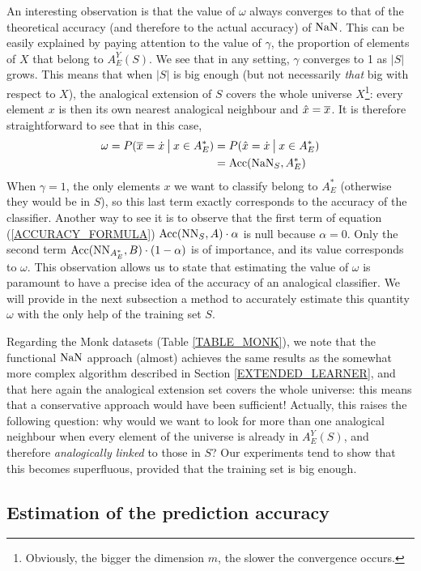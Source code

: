 {An interesting observation is that the value of $\omega$ always converges to
that of the theoretical accuracy (and therefore to the actual accuracy) of
$\NaN$. This can be easily explained by paying attention to the value of
$\gamma$, the proportion of elements of $X$ that belong to $A_E^Y(S)$. We see
that in any setting, $\gamma$ converges to 1 as $|S|$ grows. This means that
when $|S|$ is big enough (but not necessarily \textit{that} big with respect to $X$), the
analogical extension of $S$ covers the whole universe $X$\footnote{Obviously,
the bigger the dimension $m$, the slower the convergence occurs.}: every
element $x$ is then its own nearest analogical neighbour and $\hat{x} =
\albl{x}$. It is therefore straightforward to see that in this case,
\begin{align*}
  \omega = P(\albl{x} = \dot{x} \given[\big] x \in A_E^*) &= P(\hat{x}
  = \dot{x} \given[\big] x \in A_E^*)\\
&= \acc(\NaN_S, A_E^*)
\end{align*}
When $\gamma = 1$, the only elements $x$ we want to classify belong to $A_E^*$
(otherwise they would be in $S$), so this last term exactly corresponds to the
accuracy of the classifier. Another way to see it is to observe that the first
term of equation (\ref{ACCURACY_FORMULA}) $\acc(\NN_{S}, A) \cdot \alpha$ is null
because $\alpha = 0$. Only the second term $\acc(\NN_{A_E^*}, B) \cdot (1 -
\alpha)$ is of importance, and its value corresponds to $\omega$. This
observation allows us to state that estimating the value of $\omega$ is
paramount to have a precise idea of the accuracy of an analogical classifier.
We will provide in the next subsection a method to accurately estimate this
quantity $\omega$ with the only help of the training set $S$.

Regarding the Monk datasets (Table \ref{TABLE_MONK}), we note that the
functional $\NaN$ approach (almost) achieves the same results as the somewhat
more complex algorithm described in Section \ref{EXTENDED_LEARNER}, and that
here again the analogical extension set covers the whole universe: this means
that a conservative approach would have been sufficient! Actually, this raises
the following question: why would we want to look for more than one analogical
neighbour when every element of the universe is already in $A_E^Y(S)$, and
therefore \textit{analogically linked} to those in $S$? Our experiments tend to
show that this becomes superfluous, provided that the training set is big
enough.

\subsection{Estimation of the prediction accuracy}

}
